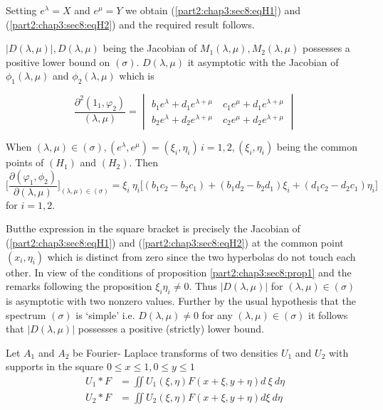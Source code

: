 Setting $e^\lambda = X$ and $e^\mu = Y$ we obtain
(\ref{part2:chap3:sec8:eqH1}) and (\ref{part2:chap3:sec8:eqH2}) 
and the required result follows. 

\begin{coro*}%
  $|D(\lambda,\mu)|, D(\lambda,\mu)$ being the Jacobian of
  $M_1(\lambda,\mu), M_2 (\lambda,\mu)$ possesses a positive lower
  bound on $(\sigma)$. $D(\lambda,\mu)$ it asymptotic with the
  Jacobian of $\phi_1 (\lambda,\mu)$ and $\phi_2(\lambda,\mu)$ which
  is  
\end{coro*}

\begin{equation*}
  \frac{\partial^2(1_1, \varphi_2)}{(\lambda,\mu)} = \begin{vmatrix}
    b_1 e^\lambda + d_1 e^{\lambda + \mu} \quad c_1 e^\mu + d_1
    e^{\lambda + \mu}\\  b_2 e^\lambda + d_2 e^{\lambda + \mu} \quad
    c_2 e^{\mu} + d_2 e^{\lambda + \mu}  \end{vmatrix} 
\end{equation*}

When $(\lambda,\mu) \in (\sigma), (e^\lambda, e^\mu) = (\xi_i,
\eta_i)\, 
i = 1,2, (\xi_i,\eta_i)$ being the common points of $(H_1)$ and
$(H_2)$. Then 
$$
\Big[\frac{ \partial (\varphi_1,\phi_2)}{\partial
    (\lambda,\mu)}\Big]_{(\lambda,\mu) \in (\sigma)} = \xi_i ~ \eta_i
\Big[ (b_1 c_2 - b_2 c_1) + (b_1 d_2 - b_2 d_1) \xi_i + (d_1 c_2  -
  d_2 c_1) \eta_i\Big] 
$$
for $i = 1,2$.

But\pageoriginale the expression in the square bracket is precisely
the Jacobian of 
(\ref{part2:chap3:sec8:eqH1}) and (\ref{part2:chap3:sec8:eqH2}) at the
common point $(x_i,\eta_i)$ which is 
distinct from zero since the two hyperbolas do not touch each
other. In view of the conditions of proposition \ref{part2:chap3:sec8:prop1} and the remarks
following the proposition $\xi_i \eta_i \neq 0$. Thus $|
D(\lambda,\mu) |$ for $(\lambda,\mu) \in (\sigma)$ is asymptotic with
two nonzero values. Further by the usual hypothesis that the spectrum
$(\sigma)$ is `simple' i.e. $D(\lambda,\mu) \neq  0$ for any
$(\lambda, \mu) \in (\sigma)$ it follows that $| D (\lambda,\mu) |$
possesses a positive (strictly) lower bound. 

Let $A_1$ and $A_2$ be Fourier- Laplace transforms of two densities
$U_1$ and $U_2$ with supports in the square $0 \le x \le 1, 0 \le y
\le 1$ 
\begin{align*}
  U_1 * F & = \iint U_1 (\xi,\eta) F(x + \xi, y+ \eta) d ~ \xi ~ d\eta\\
  U_2 * F & = \iint U_2 (\xi,\eta) F(x+ \xi, y+ \eta) d\xi ~ d\eta
\end{align*}


